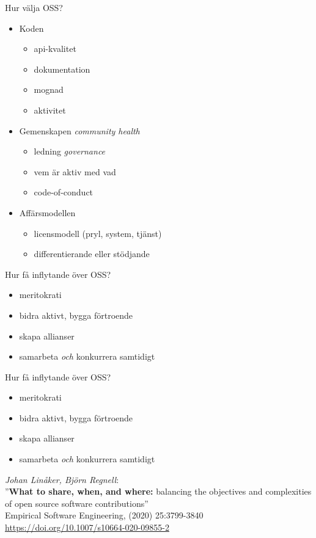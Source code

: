 \documentclass{simpleslides}
\begin{document}
\begin{Slide}{Hur välja OSS?}
\begin{itemize}
\item Koden
\begin{itemize}
\item api-kvalitet 
\item dokumentation
\item mognad
\item aktivitet
\end{itemize}  
\item Gemenskapen \hfill \emph{community health}
\begin{itemize}
\item ledning \hfill \emph{governance}
\item vem är aktiv med vad
\item code-of-conduct 
\end{itemize}  
\item Affärsmodellen
\begin{itemize}
\item licensmodell (pryl, system, tjänst)
\item differentierande eller stödjande
\end{itemize}  
\end{itemize}  
\end{Slide}

\begin{Slide}{Hur få inflytande över OSS?}
\begin{itemize}
  \item meritokrati
  \item bidra aktivt, bygga förtroende
  \item skapa allianser
  \item samarbeta \emph{och} konkurrera samtidigt
\end{itemize}  
\end{Slide}


\begin{Slide}{Hur få inflytande över OSS?}
\begin{itemize}
  \item meritokrati
  \item bidra aktivt, bygga förtroende
  \item skapa allianser
  \item samarbeta \emph{och} konkurrera samtidigt
\end{itemize}  

\vspace{1em}
{
\small \emph{Johan Linåker, Björn Regnell}:\\ ''\textbf{What to share, when, and where:} balancing the objectives and complexities of open source software contributions'' \\Empirical Software Engineering, (2020) 25:3799-3840 } \\ {\tiny \url{https://doi.org/10.1007/s10664-020-09855-2}}
\end{Slide}
\end{document}
